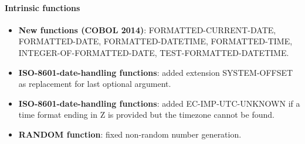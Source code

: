\paragraph{Intrinsic functions}
\begin{itemize}
\item \textbf{New functions (COBOL 2014)}: FORMATTED-CURRENT-DATE, FORMATTED-DATE, FORMATTED-DATETIME, FORMATTED-TIME, INTEGER-OF-FORMATTED-DATE, TEST-FORMATTED-DATETIME.
\item \textbf{ISO-8601-date-handling functions}: added extension SYSTEM-OFFSET as replacement for last optional argument.
\item \textbf{ISO-8601-date-handling functions}: added EC-IMP-UTC-UNKNOWN if a time format ending in Z is provided but the timezone cannot be found.
\item \textbf{RANDOM function}: fixed non-random number generation.
\end{itemize}


